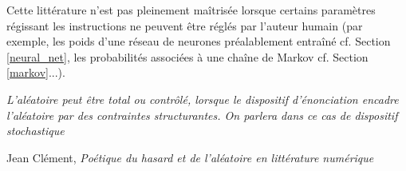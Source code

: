 \documentclass{article}
\newenvironment{citationbox}
{\begin{center}
		\begin{minipage}{.8\textwidth}
		}
		{
		\end{minipage}	
\end{center}
}
\begin{document}
			Cette littérature n'est pas pleinement maîtrisée lorsque certains paramètres régissant les instructions ne peuvent être réglés par l'auteur humain (par exemple, les poids d'une réseau de neurones préalablement entraîné cf. Section \ref{neural_net}, les probabilités associées à une chaîne de Markov cf. Section \ref{markov}...).\\
			\begin{citationbox}
				\textit{L'aléatoire peut être total ou contrôlé, lorsque le dispositif d'énonciation encadre l'aléatoire par des contraintes structurantes. On parlera dans ce cas de dispositif stochastique}
				\begin{flushright}
					Jean Clément, \textit{Poétique du hasard et de l'aléatoire en littérature numérique} \autocite{clement2011}
				\end{flushright}
			\end{citationbox}
			
\end{document}

